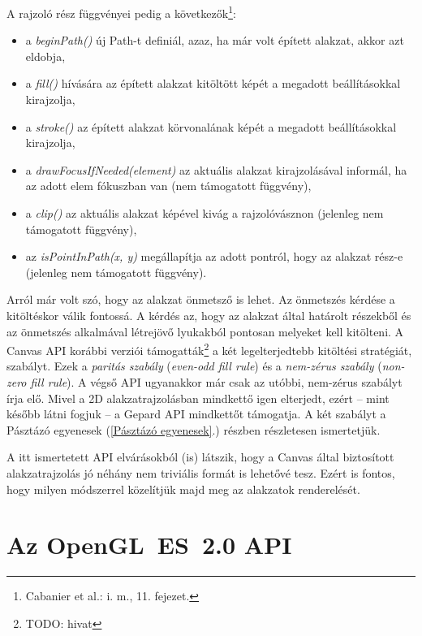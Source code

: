 \documentclass[12pt]{report}
\theoremstyle{definition}
\newcommand{\inenglish}[1]{\textsl{#1}}
\newcommand{\func}[1]{{\textsl{#1}}}
\begin{document}
A rajzoló rész függvényei pedig a következők\footnote{Cabanier et al.: i.
m., 11. fejezet.}:
\begin{itemize}
  \item a \func{beginPath()} új Path-t definiál, azaz, ha már volt épített
  alakzat, akkor azt eldobja,
  \item a \func{fill()} hívására az épített alakzat kitöltött képét a
  megadott beállításokkal kirajzolja,
  \item a \func{stroke()} az épített alakzat körvonalának képét a
  megadott beállításokkal kirajzolja,
  \item a \func{drawFocusIfNeeded(element)} az aktuális alakzat kirajzolásával
   informál, ha az adott elem fókuszban van (nem támogatott függvény),
  \item a \func{clip()} az aktuális alakzat képével kivág a
  rajzolóvásznon (jelenleg nem támogatott függvény),
  \item az \func{isPointInPath(x, y)} megállapítja az adott pontról, hogy az
  alakzat rész-e (jelenleg nem támogatott függvény).
\end{itemize}

Arról már volt szó, hogy az alakzat önmetsző is lehet. Az önmetszés kérdése a
kitöltéskor válik fontossá. A kérdés az, hogy az alakzat által határolt
részekből és az önmetszés alkalmával létrejövő lyukakból pontosan melyeket kell
kitölteni. A Canvas API korábbi verziói támogatták\footnote{TODO: hivat} a két
legelterjedtebb kitöltési stratégiát, szabályt. Ezek a \emph{paritás szabály}
(\inenglish{even-odd fill rule}) és a \emph{nem-zérus szabály}
(\inenglish{non-zero fill rule}). A végső API ugyanakkor már csak az utóbbi,
nem-zérus szabályt írja elő. Mivel a 2D alakzatrajzolásban mindkettő igen
elterjedt, ezért -- mint később látni fogjuk -- a Gepard API mindkettőt
támogatja. A két szabályt a Pásztázó egyenesek (\ref{Pásztázó egyenesek}.)
részben részletesen ismertetjük.

A itt ismertetett API elvárásokból (is) látszik, hogy a Canvas által
biztosított alakzatrajzolás jó néhány nem triviális formát is lehetővé tesz.
Ezért is fontos, hogy milyen módszerrel közelítjük majd meg az alakzatok
renderelését.

    \section{Az OpenGL~ES~2.0 API}
    \label{GLES2:API}
\end{document}
